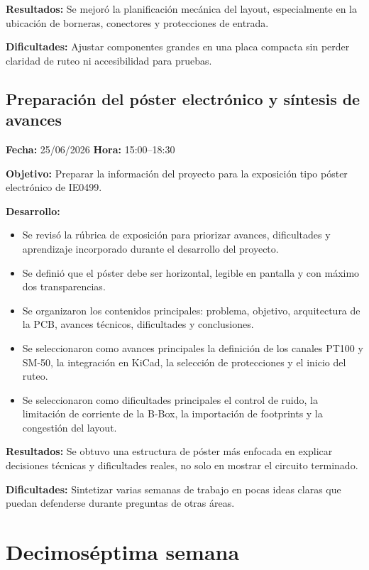 \documentclass[12pt]{article}
\begin{document}
\textbf{Resultados:}
Se mejoró la planificación mecánica del layout, especialmente en la ubicación de borneras, conectores y protecciones de entrada.

\textbf{Dificultades:}
Ajustar componentes grandes en una placa compacta sin perder claridad de ruteo ni accesibilidad para pruebas.

\subsection{Preparación del póster electrónico y síntesis de avances}
\textbf{Fecha:} 25/06/2026 \quad \textbf{Hora:} 15:00--18:30

\textbf{Objetivo:}
Preparar la información del proyecto para la exposición tipo póster electrónico de IE0499.

\textbf{Desarrollo:}
\begin{itemize}
\item Se revisó la rúbrica de exposición para priorizar avances, dificultades y aprendizaje incorporado durante el desarrollo del proyecto.
\item Se definió que el póster debe ser horizontal, legible en pantalla y con máximo dos transparencias.
\item Se organizaron los contenidos principales: problema, objetivo, arquitectura de la PCB, avances técnicos, dificultades y conclusiones.
\item Se seleccionaron como avances principales la definición de los canales PT100 y SM-50, la integración en KiCad, la selección de protecciones y el inicio del ruteo.
\item Se seleccionaron como dificultades principales el control de ruido, la limitación de corriente de la B-Box, la importación de footprints y la congestión del layout.
\end{itemize}

\textbf{Resultados:}
Se obtuvo una estructura de póster más enfocada en explicar decisiones técnicas y dificultades reales, no solo en mostrar el circuito terminado.

\textbf{Dificultades:}
Sintetizar varias semanas de trabajo en pocas ideas claras que puedan defenderse durante preguntas de otras áreas.



\section{Decimoséptima semana}
\end{document}
